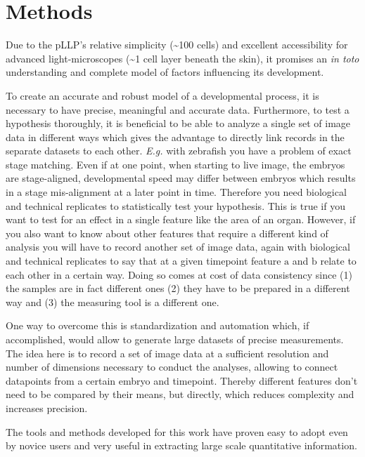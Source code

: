 \documentclass[11pt,singlespacinge,twoside]{reedthesis} %
\theoremstyle{definition}
\theoremstyle{definition}
\theoremstyle{definition}
\theoremstyle{remark}
\begin{document}
\hypertarget{methods}{%
\section{Methods}\label{methods}}

Due to the pLLP's relative simplicity (\textasciitilde100 cells) and excellent accessibility for advanced light-microscopes (\textasciitilde1 cell layer beneath the skin), it promises an \emph{in toto} understanding and complete model of factors influencing its development.

To create an accurate and robust model of a developmental process, it is necessary to have precise, meaningful and accurate data. Furthermore, to test a hypothesis thoroughly, it is beneficial to be able to analyze a single set of image data in different ways which gives the advantage to directly link records in the separate datasets to each other. \emph{E.g.} with zebrafish you have a problem of exact stage matching. Even if at one point, when starting to live image, the embryos are stage-aligned, developmental speed may differ between embryos which results in a stage mis-alignment at a later point in time. Therefore you need biological and technical replicates to statistically test your hypothesis. This is true if you want to test for an effect in a single feature like the area of an organ. However, if you also want to know about other features that require a different kind of analysis you will have to record another set of image data, again with biological and technical replicates to say that at a given timepoint feature \(\mathrm{a}\) and \(\mathrm{b}\) relate to each other in a certain way. Doing so comes at cost of data consistency since (1) the samples are in fact different ones (2) they have to be prepared in a different way and (3) the measuring tool is a different one.

One way to overcome this is standardization and automation which, if accomplished, would allow to generate large datasets of precise measurements. The idea here is to record a set of image data at a sufficient resolution and number of dimensions necessary to conduct the analyses, allowing to connect datapoints from a certain embryo and timepoint. Thereby different features don't need to be compared by their means, but directly, which reduces complexity and increases precision.

The tools and methods developed for this work have proven easy to adopt even by novice users and very useful in extracting large scale quantitative information.
\end{document}
